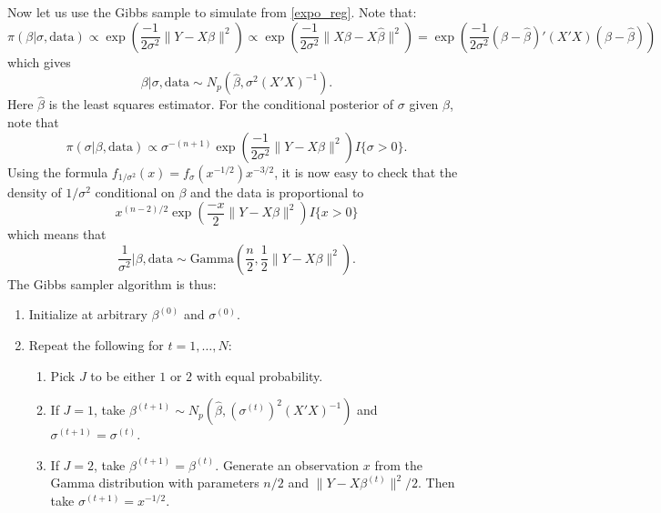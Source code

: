 \documentclass{scrartcl}
\begin{document}
Now let us use the Gibbs sample to simulate from
\eqref{expo_reg}. Note that:
   \begin{equation*}
     \pi(\beta | \sigma, \text{data}) \propto \exp \left(\frac{-1}{2
         \sigma^2} \|Y - X \beta\|^2 \right) \propto \exp \left(\frac{-1}{2
         \sigma^2} \|X \beta - X \hat \beta\|^2 \right) = \exp \left(\frac{-1}{2
         \sigma^2} (\beta - \hat \beta)' (X' X) (\beta - \hat \beta) \right)
   \end{equation*}
   which gives
   \begin{equation*}
     \beta | \sigma, \text{data} \sim N_p \left(\hat \beta, \sigma^2
       (X' X)^{-1} \right). 
   \end{equation*}
Here $\hat{\beta}$ is the least squares estimator. For the conditional
posterior of $\sigma$ given $\beta$, note that
\begin{equation*}
  \pi(\sigma | \beta, \text{data}) \propto   \sigma^{-(n+1)} \exp
  \left(\frac{-1}{2 \sigma^2} \|Y  - X \beta\|^2 \right) I\{\sigma >
  0\}. 
\end{equation*}
Using the formula $f_{1/\sigma^2}(x) = f_{\sigma}(x^{-1/2}) x^{-3/2}$,
it is now easy to check that the density of $1/\sigma^2$  conditional
on $\beta$ and the data is proportional to  
\begin{equation*}
    x^{(n-2)/2}  \exp \left(\frac{-x}{2} \|Y - X \beta\|^2 \right) I
    \{x > 0\}
  \end{equation*}
  which means that
  \begin{equation*}
    \frac{1}{\sigma^2} \biggr| \beta, \text{data} \sim \text{Gamma}
    \left(\frac{n}{2}, \frac{1}{2} \|Y - X\beta\|^2 \right). 
  \end{equation*}
   The Gibbs sampler algorithm is thus: 
   \begin{enumerate}
   \item Initialize at arbitrary $\beta^{(0)}$ and $\sigma^{(0)}$.
   \item Repeat the following for $t = 1, \dots, N$:
     \begin{enumerate}
     \item Pick $J$ to be either $1$ or $2$ with equal probability.
     \item If $J =1$, take $\beta^{(t+1)} \sim N_p(\hat{\beta},
       (\sigma^{(t)})^2 (X' X)^{-1})$ and $\sigma^{(t+1)} =
       \sigma^{(t)}$.
     \item If $J = 2$, take $\beta^{(t+1)} = \beta^{(t)}$. Generate an observation
     $x$ from the Gamma distribution with parameters $n/2$ and
     $\|Y - X\beta^{(t)}\|^2/2$. Then take $\sigma^{(t+1)} =
     x^{-1/2}$. 
     \end{enumerate}
   \end{enumerate}
\end{document}
